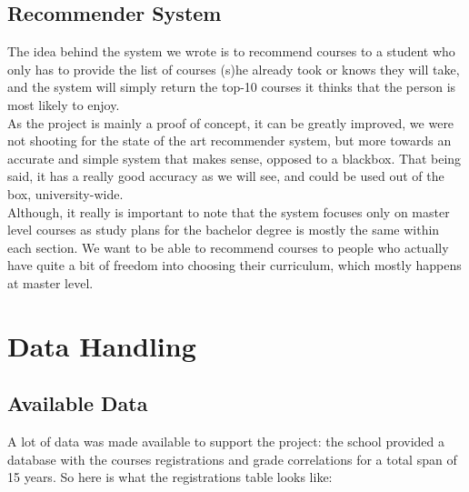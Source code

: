 \documentclass{article}
\begin{document}
    \subsection{Recommender System}
        The idea behind the system we wrote is to recommend courses to a student who only has to provide the list of courses (s)he already took or knows they will take, and the system will simply return the top-10 courses it thinks that the person is most likely to enjoy.
        \\As the project is mainly a proof of concept, it can be greatly improved, we were not shooting for the state of the art recommender system, but more towards an accurate and simple system that makes sense, opposed to a blackbox. That being said, it has a really good accuracy as we will see, and could be used out of the box, university-wide.
        \\Although, it really is important to note that the system focuses only on master level courses as study plans for the bachelor degree is mostly the same within each section. We want to be able to recommend courses to people who actually have quite a bit of freedom into choosing their curriculum, which mostly happens at master level.

\newpage
\section{Data Handling}
    \subsection{Available Data}
        A lot of data was made available to support the project: the school provided a database with the courses registrations and grade correlations for a total span of 15 years. So here is what the registrations table looks like:
\end{document}
